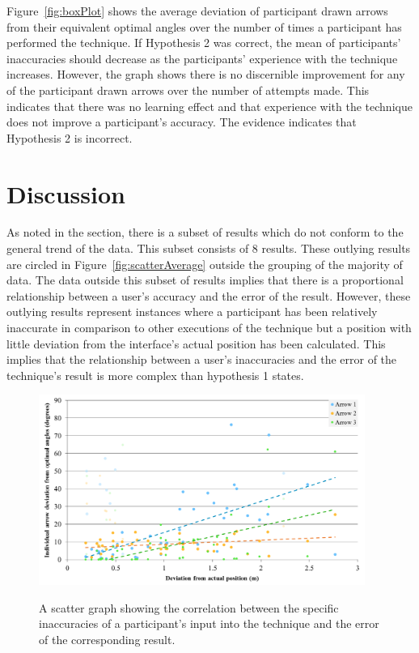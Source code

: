 \documentclass{bmcart}
\begin{document}
Figure~\ref{fig:boxPlot} shows the average deviation of participant drawn arrows from their equivalent optimal angles over the number of times a participant has performed the technique.
If Hypothesis 2 was correct, the mean of participants' inaccuracies should decrease as the participants' experience with the technique increases.
However, the graph shows there is no discernible improvement for any of the participant drawn arrows over the number of attempts made.
This indicates that there was no learning effect and that experience with the technique does not improve a participant's accuracy.
The evidence indicates that Hypothesis 2 is incorrect.


\section*{Discussion}\label{sec:discussion}

As noted in the  section, there is a subset of results which do not conform to the general trend of the data.
This subset consists of 8 results.
These outlying results are circled in Figure~\ref{fig:scatterAverage} outside the grouping of the majority of data.
The data outside this subset of results implies that there is a proportional relationship between a user's accuracy and the error of the result.
However, these outlying results represent instances where a participant has been relatively inaccurate in comparison to other executions of the technique but a position with little deviation from the interface's actual position has been calculated.
This implies that the relationship between a user's inaccuracies and the error of the technique's result is more complex than hypothesis 1 states.

\begin{figure}[h]
   \centering
   \caption{A scatter graph showing the correlation between the specific inaccuracies of a participant's input into the technique and the error of the corresponding result.}
   \includegraphics[width=0.95\textwidth]{figures/total_deviation_vs_angle_deviations.png}
   \label{fig:scatterIndividual}
\end{figure}
\end{document}
